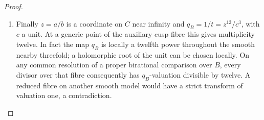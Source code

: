 \begin{proof}
\begin{enumerate}[label=\arabic*.,leftmargin=*]
\item Finally $z=a/b$ is a coordinate on
$C$ near infinity and
$q_B=1/t=z^{12}/c^3$, with $c$ a unit.
At a generic point of the auxiliary
cusp fibre this gives multiplicity
twelve. In fact the map $q_B$ is
locally a twelfth power throughout
the smooth nearby threefold; a
holomorphic root of the unit can
be chosen locally. On any common
resolution of a proper birational
comparison over $B$, every divisor
over that fibre consequently has
$q_B$-valuation divisible by twelve.
A reduced fibre on another smooth
model would have a strict transform
of valuation one, a contradiction.

\end{enumerate}
\end{proof}

